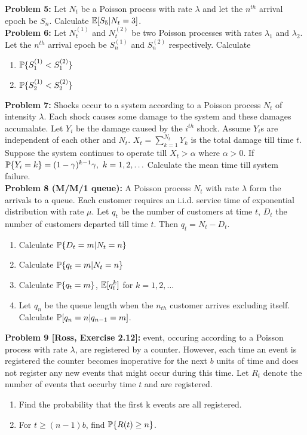 \documentclass[a4paper,10pt,english]{article}
\begin{document}
\indent \textbf{Problem 5:} Let $N_t$ be a Poisson process with rate $\lambda$ and let the $n^{th}$ arrival epoch be $S_n$. Calculate $\E[S_5|N_t = 3]$. \\
\indent \textbf{Problem 6:} Let $N^{(1)}_t$ and $N^{(2)}_t$ be two  Poisson processes with rates $\lambda_1$ and $\lambda_2$. Let the $n^{th}$ arrival epoch be $S^{(1)}_n$ and $S^{(2)}_n$ respectively. Calculate
\begin{enumerate}
\item $\P\{ S^{(1)}_1 < S^{(2)}_1\}$
\item $\P\{ S^{(1)}_2 < S^{(2)}_2\}$
\end{enumerate} 

\indent \textbf{Problem 7:} Shocks occur to a system according to a Poisson process $N_t$ of intensity $\lambda$. Each shock causes some damage to the system and these damages accumalate. Let $Y_i$ be the damage caused by the $i^{th}$ shock. Assume $Y_i$s are independent of each other and $N_t$. $X_t = \sum_{k=1}^{N_t} Y_k$ is the total damage till time $t$. Suppose the system continues to operate till $X_t > \alpha$ where $\alpha > 0$. If $\P\{Y_i = k\} = (1-\gamma)^{k-1}\gamma, \ k = 1,2,\ldots$ Calculate the mean time till system failure.  \\
\indent \textbf{Problem 8 (M/M/1 queue):} A Poisson process $N_t$ with rate $\lambda$ form the arrivals to a queue. Each customer requires an i.i.d. service time of exponential distribution with rate $\mu$. Let $q_t$ be the number of customers at time $t$, $D_t$ the number of customers departed till time $t$. Then $q_t = N_t - D_t$. 
\begin{enumerate}
\item Calculate $\P\{D_t=m|N_t=n\}$
\item Calculate $\P\{q_t=m|N_t=n\}$
\item Calculate $\P\{q_t=m\}$, $\E[q_t^k]$ for $k=1,2,\ldots$
\item Let $q_n$ be the queue length when the $n_{th}$ customer arrives excluding itself. Calculate $\P[q_n = n|q_{n-1} = m]$.
\end{enumerate}

\indent \textbf{Problem 9 [Ross, Exercise 2.12]:} event, occuring according to a Poisson process with rate $\lambda$, are registered by a counter. However, each time an event is registered the counter becomes inoperative for the next $b$ units of time and does not register any new events that might occur during this time. Let $R_t$ denote the number of events that occurby time $t$ and are registered. 
\begin{enumerate}
\item Find the probability that the first k events are all registered.
\item For $t \geq (n-1)b$, find $\P\{R(t) \geq n\}$.
\end{enumerate}
\end{document}
